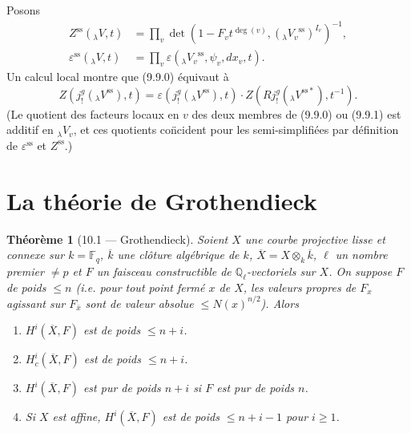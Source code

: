 \documentclass[11pt]{amsart}
\theoremstyle{plain}
\newtheorem{theorem}{Th\'eor\`eme}[section]
\theoremstyle{definition}
\begin{document}
Posons
\begin{align*}
Z^{\mathrm{ss}}(_\lambda V,t) &= \prod_v \det(1 - F_v t^{\deg(v)}, ({_\lambda V_v}^{\mathrm{ss}})^{I_v})^{-1}, \\
\varepsilon^{\mathrm{ss}}(_\lambda V,t) &= \prod_v \varepsilon({_\lambda V_v}^{\mathrm{ss}}, \psi_v, dx_v, t).
\end{align*}
Un calcul local montre que (9.9.0) \'equivaut \`a
\begin{equation}
Z(j_!^g({_\lambda V}^{\mathrm{ss}}),t) = \varepsilon(j_!^g({_\lambda V}^{\mathrm{ss}}),t) \cdot Z(Rj_!^g({_\lambda V}^{\mathrm{ss}*}),t^{-1}).
\tag{9.9.1}
\end{equation}
(Le quotient des facteurs locaux en $v$ des deux membres de (9.9.0) ou (9.9.1) est additif en ${_\lambda V_v}$, et ces quotients co\"ncident pour les semi-simplifi\'ees par d\'efinition de $\varepsilon^{\mathrm{ss}}$ et $Z^{\mathrm{ss}}$.)


\section{La th\'eorie de Grothendieck}

\begin{theorem}[10.1 --- Grothendieck]
Soient $X$ une courbe projective lisse et connexe sur $k = \mathbb{F}_q$, $\overline{k}$ une cl\^oture alg\'ebrique de $k$, $\overline{X} = X \otimes_k \overline{k}$, $\ell$ un nombre premier $\not= p$ et $F$ un faisceau constructible de $\mathbb{Q}_\ell$-vectoriels sur $X$. On suppose $F$ de poids $\leq n$ (i.e. pour tout point ferm\'e $x$ de $X$, les valeurs propres de $F_x$ agissant sur $F_{\bar{x}}$ sont de valeur absolue $\leq N(x)^{n/2}$). Alors
\begin{enumerate}
\item[(i)] $H^i(\overline{X}, F)$ est de poids $\leq n+i$.
\item[(ii)] $H^i_c(\overline{X}, F)$ est de poids $\leq n+i$.
\item[(iii)] $H^i(\overline{X}, F)$ est pur de poids $n+i$ si $F$ est pur de poids $n$.
\item[(iv)] Si $X$ est affine, $H^i(\overline{X}, F)$ est de poids $\leq n+i-1$ pour $i \geq 1$.
\end{enumerate}
\end{theorem}
\end{document}
